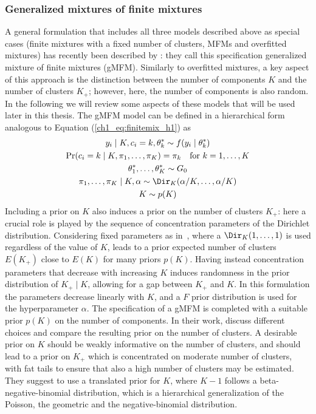 \subsubsection*{Generalized mixtures of finite mixtures}
A general formulation that includes all three models described above as special cases (finite mixtures with a fixed number of clusters, MFMs and overfitted mixtures) has recently been described by \citet{fruhwirthschnatter2020}: they call this specification generalized mixture of finite mixtures (gMFM). Similarly to overfitted mixtures, a key aspect of this approach is the distinction between the number of components $K$ and the number of clusters $K_+$; however, here, the number of components is also random. 
In the following we will review some aspects of these models that will be used later in this thesis.
The gMFM model can be defined in a hierarchical form analogous to Equation (\ref{ch1_eq:finitemix_h1}) as
\begin{equation*}
\begin{gathered}
y_i \mid K, c_i = k, \theta^*_k \sim f(y_i\mid\theta^*_k)\\
\Pr(c_i = k \mid K, \pi_1,\dots,\pi_K) = \pi_k \quad \text{for } k = 1,\dots,K\\ 
\theta^*_1,\dots,\theta^*_K \sim G_0\\
\pi_1,\dots,\pi_K \mid K, \alpha \sim \Dir_K(\alpha / K, \dots, \alpha / K)\\
K \sim p(K)
\end{gathered}
\label{ch1_eq:gMFM}
\end{equation*}
Including a prior on $K$ also induces a prior on the number of clusters $K_+$: here a crucial role is played by the sequence of concentration parameters of the Dirichlet distribution. Considering fixed parameters as in~\citet{miller2018}, where a $\Dir_K(1,\dots,1)$ is used regardless of the value of $K$, leads to a prior expected number of clusters $E(K_+)$ close to $E(K)$ for many priors $p(K)$. Having instead concentration parameters that decrease with increasing $K$ induces randomness in the prior distribution of $K_+\mid K$, allowing for a gap between $K_+$ and $K$. In this formulation the parameters decrease linearly with $K$, and a $F$ prior distribution is used for the hyperparameter $\alpha$.
The specification of a gMFM is completed with a suitable prior $p(K)$ on the number of components. In their work, \citet{fruhwirthschnatter2020} discuss different choices and compare the resulting prior on the number of clusters. 
A desirable prior on $K$ should be weakly informative on the number of clusters, and should lead to a prior on $K_+$ which is concentrated on moderate number of clusters, with fat tails to ensure that also a high number of clusters may be estimated. They suggest to use a translated prior for $K$, where $K-1$ follows a beta-negative-binomial distribution, which is a hierarchical generalization of the Poisson, the geometric and the negative-binomial distribution.

